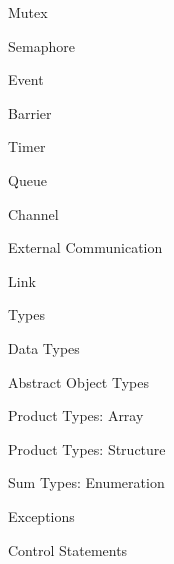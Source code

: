 \def\tocLXVI{Mutex}
{\bf{\parbox{0.95\textwidth}{\hskip20pt\tocLXVI\dotfill\pageref{toclabelLXVI}}}}\vskip5pt

\def\tocLXVII{Semaphore}
{\bf{\parbox{0.95\textwidth}{\hskip20pt\tocLXVII\dotfill\pageref{toclabelLXVII}}}}\vskip5pt

\def\tocLXVIII{Event}
{\bf{\parbox{0.95\textwidth}{\hskip20pt\tocLXVIII\dotfill\pageref{toclabelLXVIII}}}}\vskip5pt

\def\tocLXIX{Barrier}
{\bf{\parbox{0.95\textwidth}{\hskip20pt\tocLXIX\dotfill\pageref{toclabelLXIX}}}}\vskip5pt

\def\tocLXX{Timer}
{\bf{\parbox{0.95\textwidth}{\hskip20pt\tocLXX\dotfill\pageref{toclabelLXX}}}}\vskip5pt

\def\tocLXXI{Queue}
{\bf{\parbox{0.95\textwidth}{\hskip20pt\tocLXXI\dotfill\pageref{toclabelLXXI}}}}\vskip5pt

\def\tocLXXII{Channel}
{\bf{\parbox{0.95\textwidth}{\hskip20pt\tocLXXII\dotfill\pageref{toclabelLXXII}}}}\vskip5pt

\def\tocLXXIII{External Communication}
{\bf{\parbox{0.95\textwidth}{\hskip10pt\tocLXXIII\dotfill\pageref{toclabelLXXIII}}}}\vskip5pt

\def\tocLXXIV{Link}
{\bf{\parbox{0.95\textwidth}{\hskip20pt\tocLXXIV\dotfill\pageref{toclabelLXXIV}}}}\vskip5pt

\def\tocLXXV{Types}
{\bf{\parbox{0.95\textwidth}{\hskip10pt\tocLXXV\dotfill\pageref{toclabelLXXV}}}}\vskip5pt

\def\tocLXXVI{Data Types}
{\bf{\parbox{0.95\textwidth}{\hskip20pt\tocLXXVI\dotfill\pageref{toclabelLXXVI}}}}\vskip5pt

\def\tocLXXVII{Abstract Object Types}
{\bf{\parbox{0.95\textwidth}{\hskip20pt\tocLXXVII\dotfill\pageref{toclabelLXXVII}}}}\vskip5pt

\def\tocLXXVIII{Product Types: Array}
{\bf{\parbox{0.95\textwidth}{\hskip20pt\tocLXXVIII\dotfill\pageref{toclabelLXXVIII}}}}\vskip5pt

\def\tocLXXIX{Product Types: Structure}
{\bf{\parbox{0.95\textwidth}{\hskip20pt\tocLXXIX\dotfill\pageref{toclabelLXXIX}}}}\vskip5pt

\def\tocLXXX{Sum Types: Enumeration}
{\bf{\parbox{0.95\textwidth}{\hskip20pt\tocLXXX\dotfill\pageref{toclabelLXXX}}}}\vskip5pt

\def\tocLXXXI{Exceptions}
{\bf{\parbox{0.95\textwidth}{\hskip20pt\tocLXXXI\dotfill\pageref{toclabelLXXXI}}}}\vskip5pt

\def\tocLXXXII{Control Statements}
{\bf{\parbox{0.95\textwidth}{\hskip10pt\tocLXXXII\dotfill\pageref{toclabelLXXXII}}}}\vskip5pt

